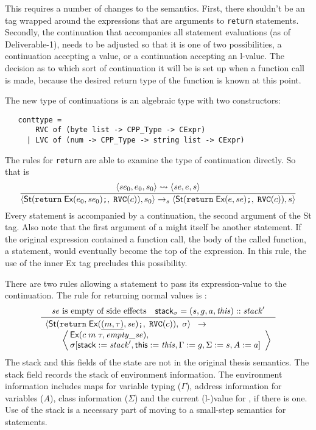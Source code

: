 \documentclass[11pt]{article}
\begin{document}
This requires a number of changes to the semantics.  First, there
shouldn't be an \crvreq{} tag wrapped around the expressions that are
arguments to \texttt{return} statements.  Secondly, the continuation
that accompanies all statement evaluations (as of Deliverable-1),
needs to be adjusted so that it is one of two possibilities, a
continuation accepting a value, or a continuation accepting an
l-value.  The decision as to which sort of continuation it will be is
set up when a function call is made, because the desired return type
of the function is known at this point.

The new type of continuations is an algebraic type with two
constructors:
\begin{verbatim}
   conttype =
       RVC of (byte list -> CPP_Type -> CExpr)
     | LVC of (num -> CPP_Type -> string list -> CExpr)
\end{verbatim}
The rules for \texttt{return} are able to examine the type of
continuation directly.  So that  is
\[
\infer{\statebrack{\textsf{St}(\ckey{return}\;\textsf{Ex}(e_0,\mathit{se}_0)\ckey{;},\;\ckey{RVC}(c)),s_0}\stmtarrow
  \statebrack{\textsf{St}(\ckey{return}\;\textsf{Ex}(e,\mathit{se})\ckey{;},\;\ckey{RVC}(c)),s}}{
  \statebrack{\mathit{se}_0,e_0,s_0}\lvtorv\statebrack{\mathit{se},e,s}}
\]
Every statement is accompanied by a continuation, the second argument
of the \textsf{St} tag. Also note that the first argument of a
 might itself be another statement.  If the original
expression contained a function call, the body of the called function,
a statement, would eventually become the top of the expression.  In
this rule, the use of the inner \textsf{Ex} tag precludes this
possibility.

There are two rules allowing a  statement to pass its
expression-value to the continuation.  The rule for returning normal
values is :
\[
\infer{%
  \begin{array}[t]{l}
    \statebrack{\textsf{St}(\ckey{return}\;\textsf{Ex}(\cvalue{m}{\tau},\mathit{se})\ckey{;},\;\ckey{RVC}(c)),
      \;\sigma}%
    \;\;\rightarrow\\
    \qquad\left\langle\!\!\begin{array}{l}
      \textsf{Ex}(c\;m\;\tau,\mathit{empty\_se}),\\
      \sigma[\textsf{stack} := \mathit{stack}', \textsf{this} :=
      \mathit{this}, \Gamma := g, \Sigma := s, A
      := a]\end{array}\right\rangle
  \end{array}}{
  \mathit{se}\mbox{ is empty of side effects} & \textsf{stack}_\sigma = (s,g,a,\mathit{this})
  :: \mathit{stack}'}
\]
The \textsf{stack} and \textsf{this} fields of the state are not in
the original thesis semantics.  The \textsf{stack} field records the
stack of environment information.  The environment information
includes maps for variable typing ($\Gamma$), address information for
variables ($A$), class information ($\Sigma$) and the current
(l-)value for , if there is one.   Use of the
\textsf{stack} is a necessary part of moving to a small-step semantics
for statements.
\end{document}
